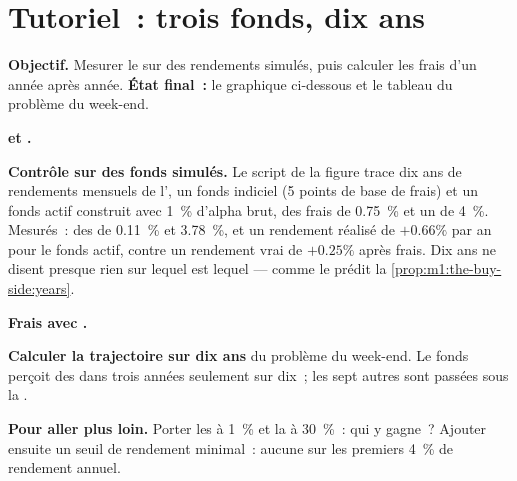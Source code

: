 \section{Tutoriel~: trois fonds, dix ans}\label{tut:m1:the-buy-side:threefunds}

\begin{tutorial}
\textbf{Objectif.} Mesurer le  sur des rendements simulés, puis calculer
les frais d'un  année après année. \textbf{État final~:} le graphique ci-dessous et le
tableau du problème du week-end.
\begin{tutsteps}
\item \textbf{ et .}
\label{lst:m1:the-buy-side:te}
\item \textbf{Contrôle sur des fonds simulés.} Le script de la figure trace dix ans
de rendements mensuels de l', un fonds indiciel (5 points de base de frais) et
un fonds actif construit avec 1~\% d'alpha brut, des frais de 0.75~\% et
un  de 4~\%. Mesurés~: des  de 0.11~\% et 3.78~\%, et
un rendement réalisé de $+0.66\%$ par an pour le fonds actif, contre un
rendement vrai de $+0.25\%$ après frais. Dix ans ne disent presque rien sur lequel est
lequel --- comme le prédit la \cref{prop:m1:the-buy-side:years}.
\item \textbf{Frais avec .}
\label{lst:m1:the-buy-side:hwm}
\item \textbf{Calculer la trajectoire sur dix ans} du problème du week-end. Le fonds perçoit des  dans
trois années seulement sur dix~; les sept autres sont passées
sous la .
\end{tutsteps}
\textbf{Pour aller plus loin.} Porter les  à 1~\% et la  à 30~\%~: qui y gagne~? Ajouter ensuite un seuil de rendement minimal~: aucune
 sur les premiers 4~\% de rendement annuel.
\end{tutorial}

